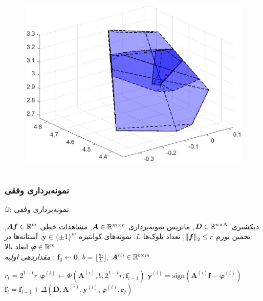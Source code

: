 \begin{frame}
\begin{columns}
\begin{figure}
\begin{overprint}
    \includegraphics[scale=0.5]{Images/polyhdr3.eps}
    \end{overprint}
\end{figure}
\end{columns}
\end{frame}
\begin{frame}
\frametitle{نمونه‌برداری وفقی}
\begin{algorithm}[H]
	\caption{$ \mathcal{Q} $: نمونه‌برداری وفقی}
	\label{alg:AQ}
	\begin{algorithmic}[1]
		\renewcommand{\algorithmicrequire}{\textbf{ورودی:}}
		\renewcommand{\algorithmicensure}{\textbf{خروجی:}}
		\REQUIRE دیکشنری $ \bm{D}\in\mathbb{R}^{n\times N} $, ماتریس نمونه‌برداری $ \bm{A}\in\mathbb{R}^{m\times n} $, مشاهدات خطی $ \bm{Af}\in \mathbb{R}^{m} $, تخمین نورم $ \left\lVert\bm{f}\right\rVert_{2}\leq r $, تعداد بلوک‌ها $ L $.
		\ENSURE  نمونه‌های کوانتیزه $ \bm{y} \in \lbrace\pm 1\rbrace^{m} $, آستانه‌ها در ابعاد بالا $ \bm{\varphi} \in \mathbb{R}^{m} $
		\\ \textit{مقدار‌دهی اولیه} : $ \bm{f}_{0}\leftarrow \bm{0} $, $ b = \lfloor\frac{m}{L}\rfloor $, $ \bm{A}^{(i)}\in \mathbb{R}^{b\times m}  $
		\begin{latin}
		\STATE $r_{t}=2^{1-t}r$
		\STATE $\bm{\varphi}^{\left(i\right)}\leftarrow \Phi(\bm{A}^{(i)},b,2^{1-t}r,\bm{f}_{i-1}) $
		\STATE $ \bm{y}^{\left(i\right)} = \text{sign}\left(\bm{A}^{(i)}\bm{f}-\bm{\varphi}^{\left(i\right)}\right)$
		\STATE $ \bm{f}_{i} = \bm{f}_{i-1} + \varDelta\left(\bm{D},\bm{A}^{(i)},\bm{y}^{\left(i\right)},\bm{\varphi}^{\left(i\right)},\bm{r}_{t}\right) $
		\ENDFOR
		\end{latin}
	\end{algorithmic} 
\end{algorithm}
\end{frame}
